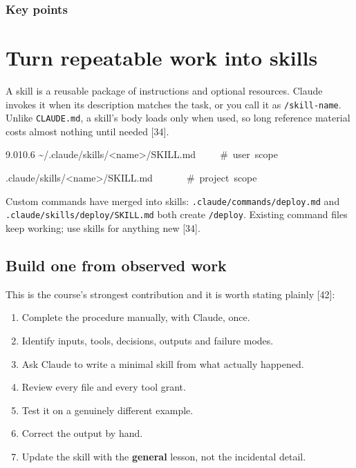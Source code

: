 \documentclass[11pt,a4paper,twoside,openany]{book}
\newcommand{\chaptertitlelabel}{}
\newcommand{\cl}[1]{\noindent\mbox{#1}\par}
\begin{document}
  \subsection*{Key points}
  \begin{itemize}\kprows\end{itemize}
\else
  \noindent\kpbody
\fi
\par\addvspace{1.4mm}
\endgroup


\FloatBarrier
\renewcommand{\chaptertitlelabel}{Part IV \textperiodcentered\ Chapter 15}
\setcounter{chapter}{14}
\chapter{Turn repeatable work into skills}

A skill is a reusable package of instructions and optional resources. Claude invokes it when its description matches the task, or you call it as \texttt{/\allowbreak{}skill-\allowbreak{}name}. Unlike \texttt{CLAUDE.\allowbreak{}md}, a skill's body loads only when used, so long reference material costs almost nothing until needed [34].


\begin{codeblock}{9.0}{10.6}
\cl{\textasciitilde{}/.claude/skills/<name>/SKILL.md~~~~~\#~user~scope}
\cl{.claude/skills/<name>/SKILL.md~~~~~~~\#~project~scope}
\end{codeblock}

Custom commands have merged into skills: \texttt{.\allowbreak{}claude/\allowbreak{}commands/\allowbreak{}deploy.\allowbreak{}md} and \texttt{.\allowbreak{}claude/\allowbreak{}skills/\allowbreak{}deploy/\allowbreak{}SKILL.\allowbreak{}md} both create \texttt{/\allowbreak{}deploy}. Existing command files keep working; use skills for anything new [34].


\FloatBarrier
\setcounter{section}{0}
\section{Build one from observed work}

This is the course's strongest contribution and it is worth stating plainly [42]:


\begin{enumerate}
\item Complete the procedure manually, with Claude, once.
\item Identify inputs, tools, decisions, outputs and failure modes.
\item Ask Claude to write a minimal skill from what actually happened.
\item Review every file and every tool grant.
\item Test it on a genuinely different example.
\item Correct the output by hand.
\item Update the skill with the \textbf{general} lesson, not the incidental detail.
\end{enumerate}
\end{document}
